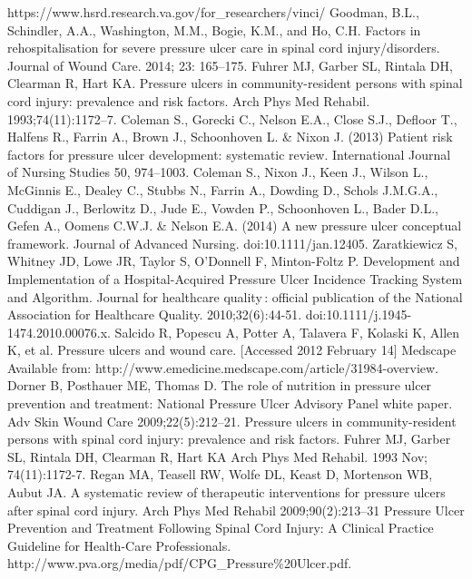 \documentclass{amia}
\begin{document}
{\begin{thebibliography}{1}
https://www.hsrd.research.va.gov/for\_researchers/vinci/
Goodman, B.L., Schindler, A.A., Washington, M.M., Bogie, K.M., and Ho, C.H. Factors in rehospitalisation for severe pressure ulcer care in spinal cord injury/disorders. Journal of Wound Care. 2014; 23: 165–175.
Fuhrer MJ, Garber SL, Rintala DH, Clearman R, Hart KA. Pressure ulcers in community-resident persons with spinal cord injury: prevalence and risk factors. Arch Phys Med Rehabil. 1993;74(11):1172–7.
Coleman S., Gorecki C., Nelson E.A., Close S.J., Defloor T., Halfens R., Farrin A., Brown J., Schoonhoven L. \& Nixon J. (2013) Patient risk factors for pressure ulcer development: systematic review. International Journal of Nursing Studies 50, 974–1003.
Coleman S., Nixon J., Keen J., Wilson L., McGinnis E., Dealey C., Stubbs N., Farrin A., Dowding D., Schols J.M.G.A., Cuddigan J., Berlowitz D., Jude E., Vowden P., Schoonhoven L., Bader D.L., Gefen A., Oomens C.W.J. \& Nelson E.A. (2014) A new pressure ulcer conceptual framework. Journal of Advanced Nursing. doi:10.1111/jan.12405.
Zaratkiewicz S, Whitney JD, Lowe JR, Taylor S, O’Donnell F, Minton-Foltz P. Development and Implementation of a Hospital-Acquired Pressure Ulcer Incidence Tracking System and Algorithm. Journal for healthcare quality : official publication of the National Association for Healthcare Quality. 2010;32(6):44-51. doi:10.1111/j.1945-1474.2010.00076.x.
Salcido R, Popescu A, Potter A, Talavera F, Kolaski K, Allen K, et al. Pressure ulcers and wound care. [Accessed 2012 February 14] Medscape Available from: http://www.emedicine.medscape.com/article/31984-overview.
Dorner B, Posthauer ME, Thomas D. The role of nutrition in pressure ulcer prevention and treatment: National Pressure Ulcer Advisory Panel white paper. Adv Skin Wound Care 2009;22(5):212–21.
Pressure ulcers in community-resident persons with spinal cord injury: prevalence and risk factors.
Fuhrer MJ, Garber SL, Rintala DH, Clearman R, Hart KA
Arch Phys Med Rehabil. 1993 Nov; 74(11):1172-7.
Regan MA, Teasell RW, Wolfe DL, Keast D, Mortenson WB, Aubut JA. A systematic review of therapeutic interventions for pressure ulcers after spinal cord injury. Arch Phys Med Rehabil 2009;90(2):213–31
Pressure Ulcer Prevention and Treatment Following Spinal Cord Injury: A Clinical Practice Guideline for Health-Care Professionals. http://www.pva.org/media/pdf/CPG\_Pressure\%20Ulcer.pdf.

\end{thebibliography}}
\end{document}
